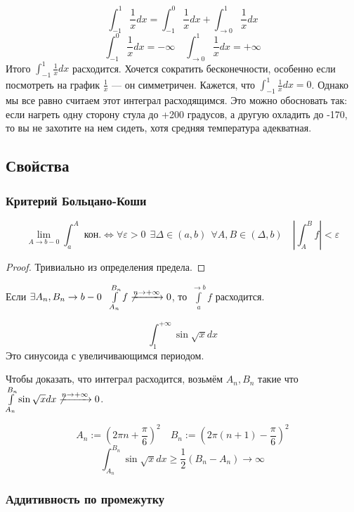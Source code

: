 \begin{example}
    $$\int_{-1}^1 \frac{1}{x}dx=\int_{-1}^0 \frac{1}{x}dx + \int_{\rightarrow 0}^{1} \frac{1}{x}dx$$
    $$\int_{-1}^0 \frac{1}{x}dx = -\infty \quad \int_{\rightarrow 0}^{1} \frac{1}{x}dx=+\infty$$
    Итого $\int_{-1}^1 \frac{1}{x}dx$ расходится. Хочется сократить бесконечности, особенно если посмотреть на график $\frac{1}{x}$ --- он симметричен. Кажется, что $\int_{-1}^1 \frac{1}{x}dx=0$. Однако мы все равно считаем этот интеграл расходящимся. Это можно обосновать так: если нагреть одну сторону стула до +200 градусов, а другую охладить до -170, то вы не захотите на нем сидеть, хотя средняя температура адекватная.
\end{example}

\subsection*{Свойства}

\subsubsection*{Критерий Больцано-Коши}

$$\lim_{A\to b-0} \int_a^A \text{ кон.} \Leftrightarrow \forall \varepsilon > 0 \ \ \exists \Delta\in(a,b) \ \ \forall A, B\in(\Delta, b) \quad \left|\int_A^B f\right|<\varepsilon$$
\begin{proof}
    Тривиально из определения предела.
\end{proof}

\begin{consequence}
    Если $\exists A_n, B_n \to b-0 \ \ \int\limits_{A_n}^{B_n} f \not\xrightarrow{n\to+\infty} 0$, то $\int\limits_a^{\rightarrow b} f$ расходится.
\end{consequence}

\begin{example}
    $$\int_1^{+\infty} \sin\sqrt x dx$$
    Это синусоида с увеличивающимся периодом.

    Чтобы доказать, что интеграл расходится, возьмём $A_n, B_n$ такие что $ \int\limits_{A_n}^{B_n} \sin\sqrt x dx \not\xrightarrow{n\to+\infty} 0$.

    $$A_n:=(2\pi n+\frac{\pi}{6})^2 \quad B_n:=\left(2\pi(n+1)-\frac{\pi}{6}\right)^2$$
    $$\int_{A_n}^{B_n} \sin\sqrt x dx \geq \frac{1}{2}(B_n-A_n)\to\infty$$
\end{example}

\subsubsection*{Аддитивность по промежутку}


